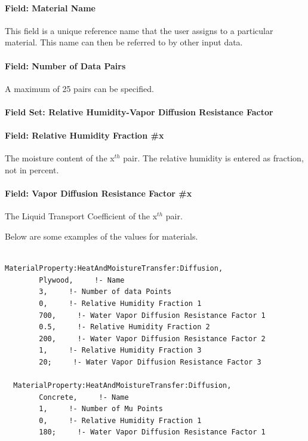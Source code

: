 \paragraph{Field: Material Name}\label{field-material-name-4}

This field is a unique reference name that the user assigns to a particular material. This name can then be referred to by other input data.

\paragraph{Field: Number of Data Pairs}\label{field-number-of-data-pairs}

A maximum of 25 pairs can be specified.

\paragraph{Field Set: Relative Humidity-Vapor Diffusion Resistance Factor}\label{field-set-relative-humidity-vapor-diffusion-resistance-factor}

\paragraph{Field: Relative Humidity Fraction \#x}\label{field-relative-humidity-fraction-x-1}

The moisture content of the x\(^{th}\) pair. The relative humidity is entered as fraction, not in percent.

\paragraph{Field: Vapor Diffusion Resistance Factor \#x}\label{field-vapor-diffusion-resistance-factor-x}

The Liquid Transport Coefficient of the x\(^{th}\) pair.

Below are some examples of the values for materials.

\begin{lstlisting}

MaterialProperty:HeatAndMoistureTransfer:Diffusion,
        Plywood,     !- Name
        3,     !- Number of data Points
        0,     !- Relative Humidity Fraction 1
        700,     !- Water Vapor Diffusion Resistance Factor 1
        0.5,     !- Relative Humidity Fraction 2
        200,     !- Water Vapor Diffusion Resistance Factor 2
        1,     !- Relative Humidity Fraction 3
        20;     !- Water Vapor Diffusion Resistance Factor 3

  MaterialProperty:HeatAndMoistureTransfer:Diffusion,
        Concrete,     !- Name
        1,     !- Number of Mu Points
        0,     !- Relative Humidity Fraction 1
        180;     !- Water Vapor Diffusion Resistance Factor 1
\end{lstlisting}

